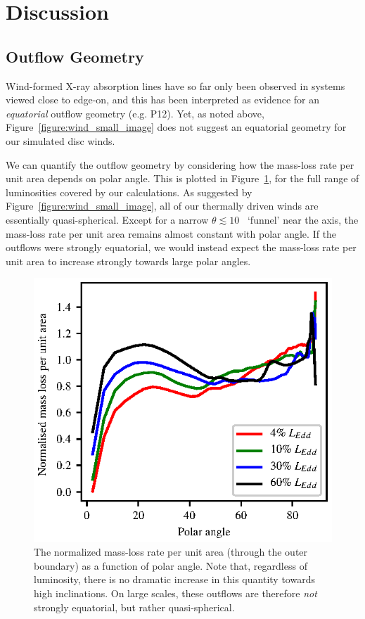 \documentclass[a4paper,fleqn,usenatbib]{mnras}
\begin{document}
\section{Discussion}
\label{section:discussion}

\subsection{Outflow Geometry}

Wind-formed X-ray absorption lines have so far only been observed in 
systems viewed close to edge-on, and this has been interpreted as
evidence for an {\em equatorial} outflow geometry
(e.g. P12). Yet, as noted above,
Figure~\ref{figure:wind_small_image} does not suggest an equatorial
geometry for our simulated disc winds.

We can quantify the outflow geometry by considering how the mass-loss
rate per unit area depends on polar angle. This is plotted in
Figure~\ref{figure:geometry1}, for the full range of luminosities covered
by our calculations. As suggested by
Figure~\ref{figure:wind_small_image}, all of our thermally driven
winds are essentially quasi-spherical. Except for a narrow $\theta
\lesssim 10$\degree~ `funnel' near the axis, the mass-loss rate per
unit area remains almost constant with polar angle. If the outflows
were strongly equatorial, we would instead expect the mass-loss rate
per unit area to increase strongly towards large polar angles.

\begin{figure}
\includegraphics[width=\columnwidth]{figures/fig2.eps}
\caption{The normalized mass-loss rate per unit area (through the
outer boundary) as a function 
of polar angle. Note that, regardless of luminosity, there is no dramatic 
increase in this quantity towards high inclinations. On large scales,
 these outflows are therefore {\em not} strongly equatorial, but rather 
 quasi-spherical.}
\label{figure:geometry1}
\end{figure}
\end{document}
